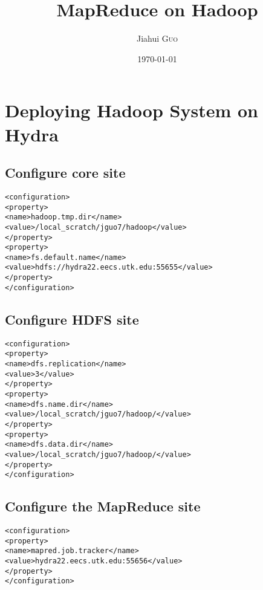 \documentclass[12pt]{article}
\title{MapReduce on Hadoop} %
\author{Jiahui \textsc{Guo}} %
\date{\today} %
\begin{document}
\maketitle %




\section{Deploying Hadoop System on Hydra}
\subsection{Configure core site}
\begin{verbatim}
<configuration>
<property>
<name>hadoop.tmp.dir</name> 
<value>/local_scratch/jguo7/hadoop</value>
</property>
<property>
<name>fs.default.name</name> 
<value>hdfs://hydra22.eecs.utk.edu:55655</value>
</property>
</configuration>
\end{verbatim}

\subsection{Configure HDFS site}
\begin{verbatim}
<configuration>
<property> 
<name>dfs.replication</name> 
<value>3</value>
</property>
<property>
<name>dfs.name.dir</name>
<value>/local_scratch/jguo7/hadoop/</value>
</property>
<property>
<name>dfs.data.dir</name>
<value>/local_scratch/jguo7/hadoop/</value>
</property>
</configuration>
\end{verbatim}

\subsection{Configure the MapReduce site}
\begin{verbatim}
<configuration>
<property> 
<name>mapred.job.tracker</name>
<value>hydra22.eecs.utk.edu:55656</value>
</property>
</configuration>
\end{verbatim}
\end{document}
